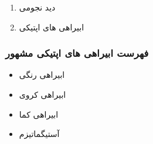 \documentclass{report}
\begin{document}
\begin{enumerate}
\item دید نجومی
\item ابیراهی های اپتیکی
\end{enumerate}

\subsubsection{فهرست ابیراهی های اپتیکی مشهور}
\begin{itemize}
\item ابیراهی رنگی
\item ابیراهی کروی
\item ابیراهی کما
\item آستیگماتیزم
\end{itemize}

\newpage

\begin{latin}

	
\end{latin}
\end{document}
